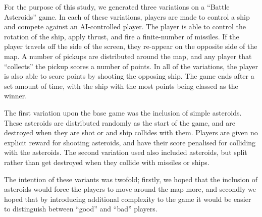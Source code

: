 For the purpose of this study, we generated three variations on a “Battle Asteroids” game. In each of these variations, players are made to control a ship and compete against an AI-controlled player. The player is able to control the rotation of the ship, apply thrust, and fire a finite-number of missiles. If the player travels off the side of the screen, they re-appear on the opposite side of the map. A number of pickups are distributed around the map, and any player that “collects” the pickup scores a number of points. In all of the variations, the player is also able to score points by shooting the opposing ship. The game ends after a set amount of time, with the ship with the most points being classed as the winner.

The first variation upon the base game was the inclusion of simple asteroids. These asteroids are distributed randomly as the start of the game, and are destroyed when they are shot or and ship collides with them. Players are given no explicit reward for shooting asteroids, and have their score penalised for colliding with the asteroids. The second variation used also included asteroids, but split rather than get destroyed when they collide with missiles or ships.

The intention of these variants was twofold; firstly, we hoped that the inclusion of asteroids would force the players to move around the map more, and secondly we hoped that by introducing additional complexity to the game it would be easier to distinguish between “good” and “bad” players.

